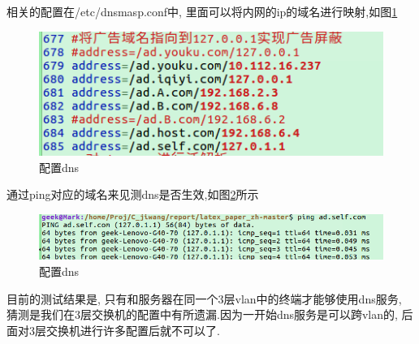 \indent	相关的配置在/etc/dnsmasp.conf中, 里面可以将内网的ip的域名进行映射,如图\ref{fig:linux_dns_conf}\\
\begin{figure}[thbp!]
\centering
\includegraphics[width=0.9\linewidth]{figure/linux_dns_conf.png}
\caption{配置dns}
\label{fig:linux_dns_conf}
\end{figure}
	通过ping对应的域名来见测dns是否生效,如图\ref{fig:linux_dns_test}所示
\begin{figure}[thbp!]
\centering
\includegraphics[width=0.9\linewidth]{figure/linux_dns_test.png}
\caption{配置dns}
\label{fig:linux_dns_test}
\end{figure}

\indent	目前的测试结果是, 只有和服务器在同一个3层vlan中的终端才能够使用dns服务, 猜测是我们在3层交换机的配置中有所遗漏.因为一开始dns服务是可以跨vlan的, 后面对3层交换机进行许多配置后就不可以了.
